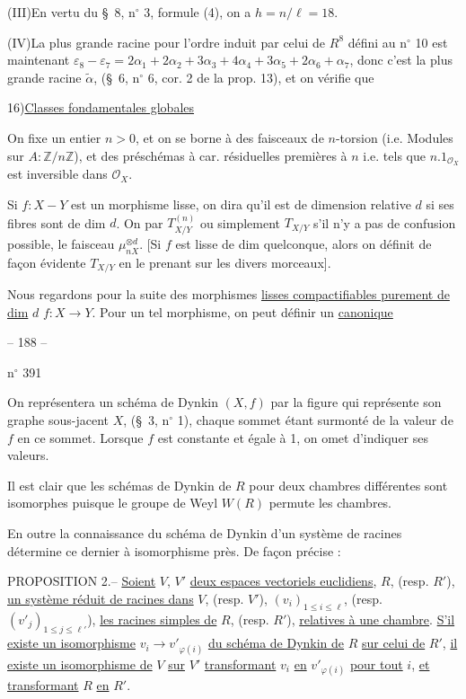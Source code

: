 (III)\quad En vertu du \S\ 8, n$^\circ$ 3, formule (4), on a $h=n/\ell=18$.

(IV)\quad La plus grande racine pour l'ordre induit par celui de $R^8$
défini au n$^\circ$ 10 est maintenant
$\varepsilon_8-\varepsilon_7=2\alpha_1+2\alpha_2+3\alpha_3+4\alpha_4+
3\alpha_5+2\alpha_6+\alpha_7$, donc c'est la plus grande racine
$\tilde\alpha$, (\S\ 6, n$^\circ$ 6, cor. 2 de la prop. 13),
et on vérifie que

16)\quad\uline{Classes fondamentales globales}

On fixe un entier $n>0$, et on se
borne à des faisceaux de $n$-torsion (i.e. Modules sur $A:\mathbb Z/n\mathbb Z$),
et des préschémas à car. résiduelles premières à $n$
i.e. tels que $n.1_{\mathcal O_X}$ est inversible dans $\mathcal O_X$.

Si $f:X\mathbin{-}Y$ est un morphisme lisse, on dira qu'il est
 de dimension relative $d$ si ses fibres sont
 de dim $d$.
On  par $T^{(n)}_{X/Y}$ ou simplement $T_{X/Y}$
s'il n'y a pas de confusion possible, le faisceau
$\mu_{nX}^{\otimes d}$.
[Si $f$ est lisse de dim  quelconque,
alors on définit de façon évidente $T_{X/Y}$ en le prenant sur les divers morceaux].

Nous regardons pour la suite des morphismes
\uline{lisses compactifiables purement de dim} $d$
$f:X\longrightarrow Y$.
Pour un tel morphisme, on peut définir un
\uline{  canonique}

\begin{center}-- 188 --\end{center}
\hfill n$^\circ$ 391

On représentera un schéma de Dynkin $(X,f)$ par la figure qui représente son
graphe sous-jacent $X$, (\S\ 3, n$^\circ$ 1), chaque sommet étant surmonté
de la valeur de $f$ en ce sommet. Lorsque $f$ est constante et égale à 1,
on omet d'indiquer ses valeurs.

Il est clair que les schémas de Dynkin de $R$ pour deux chambres différentes
sont isomorphes puisque le groupe de Weyl $W(R)$ permute les chambres.

En outre la connaissance du schéma de Dynkin d'un système de racines détermine
ce dernier à isomorphisme près. De façon précise :

PROPOSITION 2.-- \uline{Soient} $V$, $V'$ \uline{deux espaces vectoriels euclidiens},
$R$, (resp. $R'$), \uline{un système réduit de racines dans} $V$,
(resp. $V'$), $(v_i)_{1\leq i\leq\ell}$, (resp. $(v'_j)_{1\leq j\leq\ell'}$),
\uline{les racines simples de} $R$, (resp. $R'$), \uline{relatives à une chambre}.
\uline{S'il existe un isomorphisme} $v_i\longrightarrow v'_{\varphi(i)}$
\uline{du schéma de Dynkin de} $R$ \uline{sur celui de} $R'$,
\uline{il existe un isomorphisme de} $V$ \uline{sur} $V'$
\uline{transformant} $v_i$ \uline{en} $v'_{\varphi(i)}$
\uline{pour tout} $i$, \uline{et transformant} $R$ \uline{en} $R'$.

